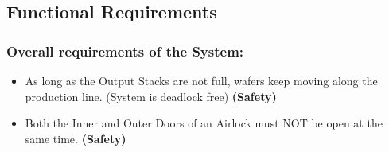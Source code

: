 \documentclass[a4paper,12pt]{article}
\begin{document}
\subsection{Functional Requirements}
\subsubsection{Overall requirements of the System:}
\begin{itemize}
\item As long as the Output Stacks are not full, wafers keep moving along the production line. (System is deadlock free) \textbf{(Safety)}
\item Both the Inner and Outer Doors of an Airlock must NOT be open at the same time.\textbf{ (Safety)}
\end{itemize}
\end{document}
